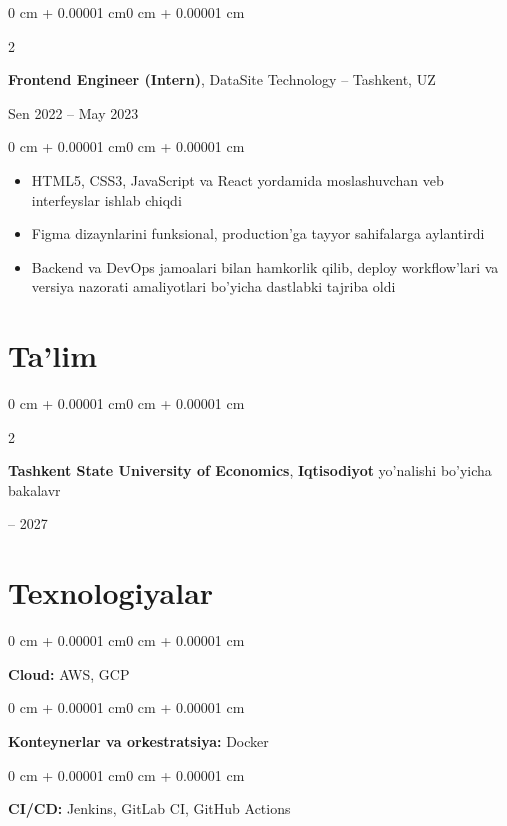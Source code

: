 \documentclass[10pt, letterpaper]{article}
\newenvironment{highlights}{
    \begin{itemize}[
        topsep=0.10 cm,
        parsep=0.10 cm,
        partopsep=0pt,
        itemsep=0pt,
        leftmargin=0 cm + 10pt
    ]
}{
    \end{itemize}
}
\newenvironment{onecolentry}{
    \begin{adjustwidth}{0 cm + 0.00001 cm}{0 cm + 0.00001 cm}
}{
    \end{adjustwidth}
}
\newenvironment{twocolentry}[2][]{
    \onecolentry
    \def\secondColumn{#2}
    \setcolumnwidth{\fill, 4.5 cm}
    \begin{paracol}{2}
}{
    \switchcolumn \raggedleft \secondColumn
    \end{paracol}
    \endonecolentry
}
\begin{document}
    \begin{twocolentry}{Sen 2022 -- May 2023}
        \textbf{Frontend Engineer (Intern)}, DataSite Technology -- Tashkent, UZ
    \end{twocolentry}
    \vspace{0.10 cm}
    \begin{onecolentry}
        \begin{highlights}
            \item HTML5, CSS3, JavaScript va React yordamida moslashuvchan veb interfeyslar ishlab chiqdi
            \item Figma dizaynlarini funksional, production'ga tayyor sahifalarga aylantirdi
            \item Backend va DevOps jamoalari bilan hamkorlik qilib, deploy workflow'lari va versiya nazorati amaliyotlari bo'yicha dastlabki tajriba oldi
        \end{highlights}
    \end{onecolentry}
    \vspace{0.90 cm}
    
    \section{Ta'lim}
    \begin{twocolentry}{2022 -- 2027}
        \textbf{Tashkent State University of Economics}, \textbf{Iqtisodiyot} yo'nalishi bo'yicha bakalavr
    \end{twocolentry}
    
\section{Texnologiyalar}

\begin{onecolentry}
\textbf{Cloud:} AWS, GCP
\end{onecolentry}

\vspace{0.2 cm}

\begin{onecolentry}
\textbf{Konteynerlar va orkestratsiya:} Docker
\end{onecolentry}

\vspace{0.2 cm}

\begin{onecolentry}
\textbf{CI/CD:} Jenkins, GitLab CI, GitHub Actions
\end{onecolentry}
\end{document}
